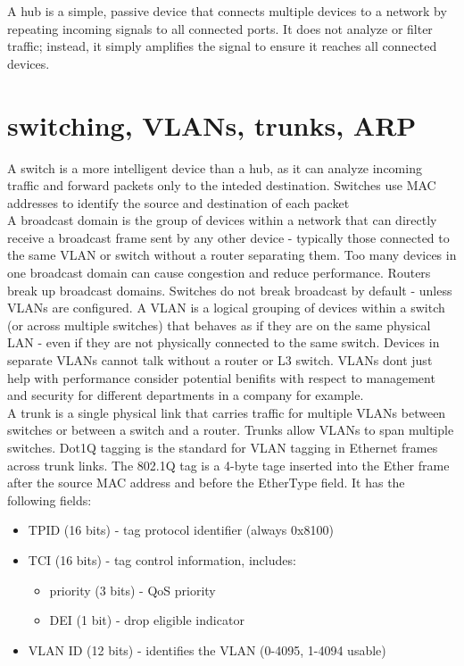 \documentclass[parindent=0pt]{article}
\begin{document}
A hub is a simple, passive device that connects multiple devices to a network by repeating incoming signals to all connected ports. It does not analyze or filter traffic; instead, it simply amplifies the signal to ensure it reaches all connected devices.\\

\section*{switching, VLANs, trunks, ARP}
A switch is a more intelligent device than a hub, as it can analyze incoming traffic and forward packets only to the inteded destination. Switches use MAC addresses to identify the source and destination of each packet\\

A broadcast domain is the group of devices within a network that can directly receive a broadcast frame sent by any other device - typically those connected to the same VLAN or switch without a router separating them. Too many devices in one broadcast domain can cause congestion and reduce performance. Routers break up broadcast domains. Switches do not break broadcast by default - unless VLANs are configured. A VLAN is a logical grouping of devices within a switch (or across multiple switches) that behaves as if they are on the same physical LAN - even if they are not physically connected to the same switch. Devices in separate VLANs cannot talk without a router or L3 switch. VLANs dont just help with performance consider potential benifits with respect to management and security for different departments in a company for example.\\

A trunk is a single physical link that carries traffic for multiple VLANs between switches or between a switch and a router. Trunks allow VLANs to span multiple switches. Dot1Q tagging is the standard for VLAN tagging in Ethernet frames across trunk links. The 802.1Q tag is a 4-byte tage inserted into the Ether frame after the source MAC address and before the EtherType field. It has the following fields: 
	\begin{itemize}	
		\item TPID (16 bits) - tag protocol identifier (always 0x8100)
		\item TCI (16 bits) - tag control information, includes:
			\begin{itemize}
				\item priority (3 bits) - QoS priority
				\item DEI (1 bit) - drop eligible indicator
			\end{itemize}
		\item VLAN ID (12 bits) - identifies the VLAN (0-4095, 1-4094 usable)
	\end{itemize}
\end{document}
